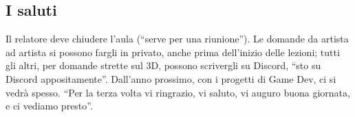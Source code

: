 \subsection{I saluti}

Il relatore deve chiudere l'aula (``serve per una riunione''). Le domande da
artista ad artista si possono fargli in privato, anche prima dell'inizio delle
lezioni; tutti gli altri, per domande strette sul 3D, possono scrivergli su
Discord, ``sto su Discord appositamente''. Dall'anno prossimo, con i progetti di
Game Dev, ci si vedrà spesso. ``Per la terza volta vi ringrazio, vi saluto, vi
auguro buona giornata, e ci vediamo presto''.
